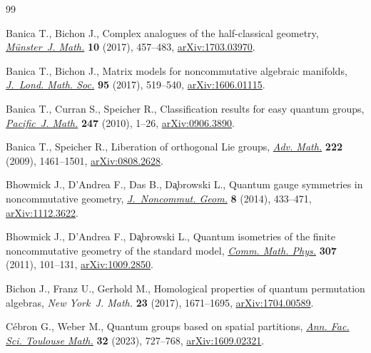 \documentclass[pdftex]{sigma}
\numberwithin{equation}{section}
\begin{document}
\begin{thebibliography}{99}
\footnotesize\itemsep=0pt

Banica T., Bichon J., Complex analogues of the half-classical geometry,
  \href{https://doi.org/10.17879/70299518811}{\textit{M\"unster~J. Math.}} \textbf{10} (2017), 457--483,
  \href{https://arxiv.org/abs/1703.03970}{arXiv:1703.03970}.

Banica T., Bichon J., Matrix models for noncommutative algebraic manifolds,
  \href{https://doi.org/10.1112/jlms.12020}{\textit{J.~Lond. Math. Soc.}} \textbf{95} (2017), 519--540,
  \href{https://arxiv.org/abs/1606.01115}{arXiv:1606.01115}.

Banica T., Curran S., Speicher R., Classification results for easy quantum
  groups, \href{https://doi.org/10.2140/pjm.2010.247.1}{\textit{Pacific~J. Math.}} \textbf{247} (2010), 1--26,
  \href{https://arxiv.org/abs/0906.3890}{arXiv:0906.3890}.

Banica T., Speicher R., Liberation of orthogonal {L}ie groups, \href{https://doi.org/10.1016/j.aim.2009.06.009}{\textit{Adv.
  Math.}} \textbf{222} (2009), 1461--1501, \href{https://arxiv.org/abs/0808.2628}{arXiv:0808.2628}.

Bhowmick J., D'Andrea F., Das B., D\c{a}browski L., Quantum gauge symmetries in
  noncommutative geometry, \href{https://doi.org/10.4171/JNCG/161}{\textit{J.~Noncommut. Geom.}} \textbf{8} (2014),
  433--471, \href{https://arxiv.org/abs/1112.3622}{arXiv:1112.3622}.

Bhowmick J., D'Andrea F., D\c{a}browski L., Quantum isometries of the finite
  noncommutative geometry of the standard model, \href{https://doi.org/10.1007/s00220-011-1301-2}{\textit{Comm. Math. Phys.}}
  \textbf{307} (2011), 101--131, \href{https://arxiv.org/abs/1009.2850}{arXiv:1009.2850}.

Bichon J., Franz U., Gerhold M., Homological properties of quantum permutation
  algebras, \textit{New York~J. Math.} \textbf{23} (2017), 1671--1695,
  \href{https://arxiv.org/abs/1704.00589}{arXiv:1704.00589}.

C\'ebron G., Weber M., Quantum groups based on spatial partitions, \href{https://doi.org/10.5802/afst.1750}{\textit{Ann.
  Fac. Sci. Toulouse Math.}} \textbf{32} (2023), 727--768, \href{https://arxiv.org/abs/1609.02321}{arXiv:1609.02321}.


\end{thebibliography}
\end{document}
